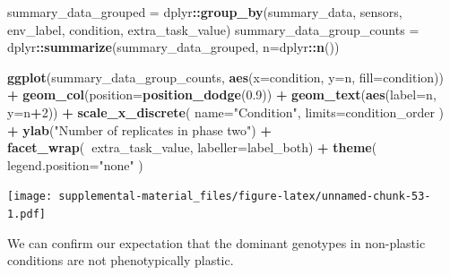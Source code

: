 \documentclass[]{book}
\newenvironment{Shaded}{\begin{snugshade}}{\end{snugshade}}
\newcommand{\DataTypeTok}[1]{\textcolor[rgb]{0.13,0.29,0.53}{#1}}
\newcommand{\DecValTok}[1]{\textcolor[rgb]{0.00,0.00,0.81}{#1}}
\newcommand{\FloatTok}[1]{\textcolor[rgb]{0.00,0.00,0.81}{#1}}
\newcommand{\KeywordTok}[1]{\textcolor[rgb]{0.13,0.29,0.53}{\textbf{#1}}}
\newcommand{\NormalTok}[1]{#1}
\newcommand{\OperatorTok}[1]{\textcolor[rgb]{0.81,0.36,0.00}{\textbf{#1}}}
\newcommand{\StringTok}[1]{\textcolor[rgb]{0.31,0.60,0.02}{#1}}
\begin{document}
\begin{Shaded}
\begin{Highlighting}[]
\NormalTok{summary_data_grouped =}\StringTok{ }\NormalTok{dplyr}\OperatorTok{::}\KeywordTok{group_by}\NormalTok{(summary_data, sensors, env_label, condition, extra_task_value)}
\NormalTok{summary_data_group_counts =}\StringTok{ }\NormalTok{dplyr}\OperatorTok{::}\KeywordTok{summarize}\NormalTok{(summary_data_grouped, }\DataTypeTok{n=}\NormalTok{dplyr}\OperatorTok{::}\KeywordTok{n}\NormalTok{())}

\KeywordTok{ggplot}\NormalTok{(summary_data_group_counts, }\KeywordTok{aes}\NormalTok{(}\DataTypeTok{x=}\NormalTok{condition, }\DataTypeTok{y=}\NormalTok{n, }\DataTypeTok{fill=}\NormalTok{condition)) }\OperatorTok{+}
\StringTok{  }\KeywordTok{geom_col}\NormalTok{(}\DataTypeTok{position=}\KeywordTok{position_dodge}\NormalTok{(}\FloatTok{0.9}\NormalTok{)) }\OperatorTok{+}
\StringTok{  }\KeywordTok{geom_text}\NormalTok{(}\KeywordTok{aes}\NormalTok{(}\DataTypeTok{label=}\NormalTok{n, }\DataTypeTok{y=}\NormalTok{n}\OperatorTok{+}\DecValTok{2}\NormalTok{)) }\OperatorTok{+}
\StringTok{  }\KeywordTok{scale_x_discrete}\NormalTok{(}
    \DataTypeTok{name=}\StringTok{"Condition"}\NormalTok{,}
    \DataTypeTok{limits=}\NormalTok{condition_order}
\NormalTok{  ) }\OperatorTok{+}
\StringTok{  }\KeywordTok{ylab}\NormalTok{(}\StringTok{"Number of replicates in phase two"}\NormalTok{) }\OperatorTok{+}
\StringTok{  }\KeywordTok{facet_wrap}\NormalTok{(}\OperatorTok{~}\NormalTok{extra_task_value, }\DataTypeTok{labeller=}\NormalTok{label_both) }\OperatorTok{+}
\StringTok{  }\KeywordTok{theme}\NormalTok{(}
    \DataTypeTok{legend.position=}\StringTok{"none"}
\NormalTok{  )}
\end{Highlighting}
\end{Shaded}

\texttt{[image: supplemental-material\_files/figure-latex/unnamed-chunk-53-1.pdf]}

We can confirm our expectation that the dominant genotypes in non-plastic conditions are not phenotypically plastic.
\end{document}
